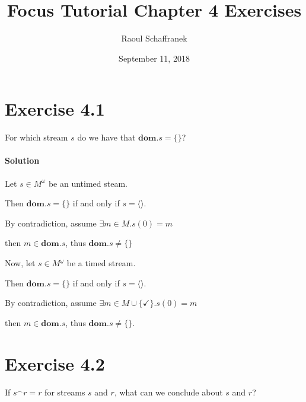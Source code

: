 \documentclass{article}[12pt]
\title{Focus Tutorial Chapter 4 Exercises}
\author{Raoul Schaffranek}
\date{September 11, 2018}
\newcommand{\concat}{\ensuremath{^{\frown}}}
\newcommand{\stream}[1]{\langle#1\rangle}
\newcommand{\dom}{\ensuremath{\textbf{dom}}}
\begin{document}
   \maketitle
   \section{Exercise 4.1}
   For which stream $s$ do we have that $\dom.s = \{\}$?
   \paragraph{Solution}{
       Let $s \in M^{\omega}$ be an untimed steam.

       Then $\dom.s = \{\}$ if and only if $s = \stream{}$.

       By contradiction, assume $\exists m \in M. s(0) = m$

       then $m \in \dom.s$, thus $\dom.s \neq \{\}$

       Now, let $s \in M^{\underline{\omega}}$ be a timed stream.

       Then $\dom.s = \{\}$ if and only if $s = \stream{}$.

       By contradiction, assume $\exists m \in M \cup \{\checkmark\} . s(0) = m$

       then $m \in \dom.s$, thus $\dom.s \neq \{\}$.
   }
   \section{Exercise 4.2}
   If $s \concat r = r$ for streams $s$ and $r$, what can we conclude about $s$ and $r$?
\end{document}
